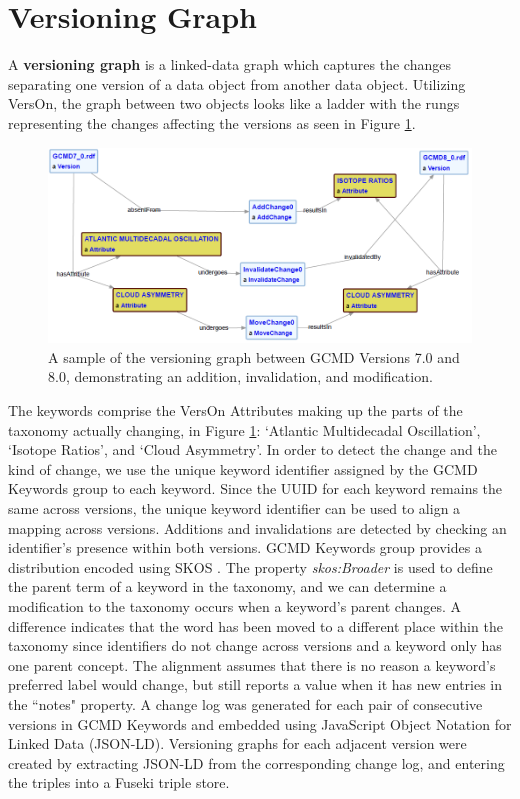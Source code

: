 \section{Versioning Graph}\label{sec:vergraph}

A \textbf{versioning graph} is a linked-data graph which captures the changes separating one version of a data object from another data object.
Utilizing VersOn, the graph between two objects looks like a ladder with the rungs representing the changes affecting the versions as seen in Figure \ref{GCMDC_VerGraph}.
\begin{figure}
	\centering
	\includegraphics[scale=0.62]{GCMD_VerGraph.png}
	\caption{A sample of the versioning graph between GCMD Versions 7.0 and 8.0, demonstrating an addition, invalidation, and modification.}
	\label{GCMDC_VerGraph}
\end{figure}
The keywords comprise the VersOn Attributes making up the parts of the taxonomy actually changing, in Figure \ref{GCMDC_VerGraph}: `Atlantic Multidecadal Oscillation', `Isotope Ratios', and `Cloud Asymmetry'.
In order to detect the change and the kind of change, we use the unique keyword identifier assigned by the GCMD Keywords group to each keyword.
Since the UUID for each keyword remains the same across versions, the unique keyword identifier can be used to align a mapping across versions.
Additions and invalidations are detected by checking an identifier's presence within both versions.
GCMD Keywords group provides a distribution encoded using SKOS \cite{skos}.
The property \textit{skos:Broader} is used to define the parent term of a keyword in the taxonomy, and we can determine a modification to the taxonomy occurs when a keyword's parent changes.
A difference indicates that the word has been moved to a different place within the taxonomy since identifiers do not change across versions and a keyword only has one parent concept.
The alignment assumes that there is no reason a keyword's preferred label would change, but still reports a value when it has new entries in the ``notes" property.
A change log was generated for each pair of consecutive versions in GCMD Keywords and embedded using JavaScript Object Notation for Linked Data (JSON-LD).
Versioning graphs for each adjacent version were created by extracting JSON-LD from the corresponding change log, and entering the triples into a Fuseki triple store.
